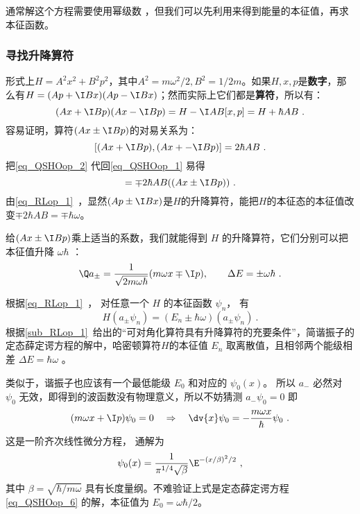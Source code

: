 通常解这个方程需要使用幂级数%
，但我们可以先利用来得到能量的本征值，再求本征函数。


\subsubsection{寻找升降算符}

形式上$H=A^2x^2+B^2p^2$，其中$A^2=m\omega^2/2, B^2=1/2m$。如果$H, x, p$是\textbf{数字}，那么有$H = (Ap+\I Bx)(Ap-\I Bx)$；然而实际上它们都是\textbf{算符}，所以有：
\begin{equation}\label{eq_QSHOop_1}
(Ax+\I Bp)(Ax-\I Bp) = H-\I AB[x, p] = H+\hbar AB~.
\end{equation}
容易证明，算符$(Ax\pm\I Bp)$的对易关系为：
\begin{equation}\label{eq_QSHOop_2}
[(Ax+\I Bp), (Ax+-\I Bp)] = 2\hbar AB~.
\end{equation}
把\autoref{eq_QSHOop_2} 代回\autoref{eq_QSHOop_1} 易得
\begin{equation}
[H, (Ax\pm\I Bp) = [H+ \hbar AB, (Ax\pm\I Bp)] = \mp 2\hbar AB ((Ax\pm\I Bp))~.
\end{equation}
由\autoref{eq_RLop_1}~，显然$(Ap\pm \I Bx)$是$H$的升降算符，能把$H$的本征态的本征值改变$\mp 2\hbar AB=\mp \hbar \omega$。

给$(Ax\pm\I Bp)$乘上适当的系数，我们就能得到 $H$ 的升降算符，它们分别可以把本征值升降 $\omega\hbar$ ：
\begin{equation}
\Q a_\pm = \frac{1}{\sqrt{2m\omega\hbar}} (m\omega x \mp \I p), 
\qquad
\Delta E = \pm \omega \hbar~.
\end{equation}

根据\autoref{eq_RLop_1}~， 对任意一个 $H$ 的本征函数 $\psi_n$， 有
\begin{equation}
H(a_\pm\psi_n) = (E_n\pm\hbar\omega) (a_ \pm \psi_n)~.
\end{equation}
根据\autoref{sub_RLop_1}~给出的“可对角化算符具有升降算符的充要条件”，简谐振子的定态薛定谔方程的解中，哈密顿算符$H$的本征值 $E_n$ 取离散值，且相邻两个能级相差 $\Delta E = \hbar \omega$ 。



类似于，谐振子也应该有一个最低能级 $E_0$ 和对应的 $\psi_0(x)$。 所以 $a_-$ 必然对 $\psi_0$ 无效，即得到的波函数没有物理意义，所以不妨猜测 $a_- \psi_0 = 0$ 
即
\begin{equation}
(m\omega x + \I p)\psi_0 = 0
\quad \Rightarrow \quad
\dv{x} \psi_0 =  - \frac{m\omega x}{\hbar } \psi_0~.
\end{equation}
这是一阶齐次线性微分方程，%
通解为
\begin{equation}
\psi_0(x) = \frac{1}{\pi^{1/4}\sqrt\beta} \E^{-(x/\beta)^2/2}~,
\end{equation}
其中 $\beta = \sqrt{\hbar /m\omega}$ 具有长度量纲。不难验证上式是定态薛定谔方程\autoref{eq_QSHOop_6} 的解，本征值为 $E_0=\omega\hbar/2$。



